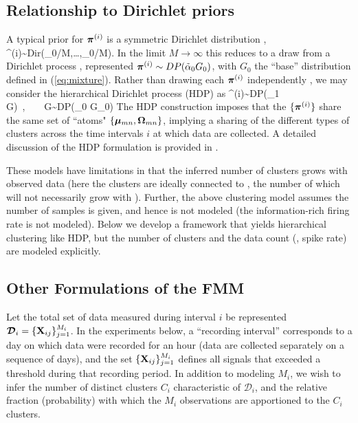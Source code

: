 \documentclass[journal]{IEEEtran}
\begin{document}
\subsection{Relationship to Dirichlet priors} \label{sec:related}



A typical prior for $\boldsymbol{\pi}^{(i)}$ is a symmetric Dirichlet distribution \cite{Dilan},
\beq \piv^{(i)}\sim\mbox{Dir}(\tilde{\alpha}_0/M,\dots,\tilde{\alpha}_0/M).\label{eq:Dir}\eeq
In the limit\add{,} $M\rightarrow\infty$\add{,} this reduces to a draw from a Dirichlet process \cite{Wood2009,Bo2011}, represented $\boldsymbol{\pi}^{(i)}\sim\relax{DP}(\tilde{\alpha}_0 G_0)$, with $G_0$ the ``base'' distribution defined in (\ref{eq:mixture}). Rather than drawing each $\boldsymbol{\pi}^{(i)}$ independently , we may consider the hierarchical Dirichlet process (HDP) \cite{HDP} as
\beq \piv^{(i)}\sim\mbox{DP}(\tilde{\alpha}_1 G)~,~~~~G\sim\mbox{DP}(\tilde{\alpha}_0 G_0)\eeq
The HDP construction imposes that the $\{\boldsymbol{\pi}^{(i)}\}$ share the same set of ``atoms" $\{\boldsymbol{\mu}_{mn},\boldsymbol{\Omega}_{mn}\}$, implying
a sharing of the different types of clusters across the time intervals $i$ at which data are collected. A detailed discussion of the HDP formulation is provided in \cite{Bo2011}.

These models have limitations in that the inferred number of clusters grows with observed data (here the clusters are ideally connected to , the number of which will not necessarily grow with  ). Further, the above clustering model assumes the number of samples is given, and hence is not modeled (the information-rich firing rate is not modeled).
Below we develop a framework that yields hierarchical clustering like HDP, but the number of clusters and the data count (, spike rate) are modeled explicitly.

\subsection{Other Formulations of the FMM} %
\label{sub:other_formulations_of_the_fmm}


Let the total set of data measured during interval $i$ be represented $\bm{\mathcal{D}}_i=\{{\mathbf X}_{ij}\}_{j=1}^{M_i}$. In the experiments below, a ``recording interval'' corresponds to a day on which data were recorded for an hour (data are collected separately on a sequence of days), and the set $\{{\mathbf X}_{ij}\}_{j=1}^{M_i}$ defines all signals that exceeded a threshold during that recording period. In addition to modeling $M_i$, we wish to infer the number of distinct clusters $C_i$ characteristic of $\bm{\mathcal{D}}_i$, and the relative fraction (probability) with which the $M_i$ observations are apportioned to the $C_i$ clusters.
\end{document}
